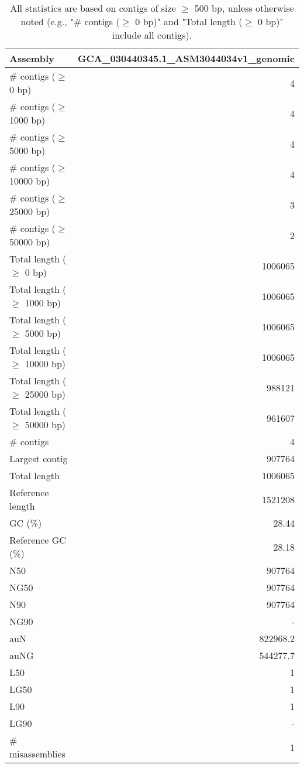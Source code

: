 \documentclass[12pt,a4paper]{article}
\begin{document}
\begin{table}[ht]
\begin{center}
\caption{All statistics are based on contigs of size $\geq$ 500 bp, unless otherwise noted (e.g., "\# contigs ($\geq$ 0 bp)" and "Total length ($\geq$ 0 bp)" include all contigs).}
\begin{tabular}{|l*{1}{|r}|}
\hline
Assembly & GCA\_030440345.1\_ASM3044034v1\_genomic \\ \hline
\# contigs ($\geq$ 0 bp) & 4 \\ \hline
\# contigs ($\geq$ 1000 bp) & 4 \\ \hline
\# contigs ($\geq$ 5000 bp) & 4 \\ \hline
\# contigs ($\geq$ 10000 bp) & 4 \\ \hline
\# contigs ($\geq$ 25000 bp) & 3 \\ \hline
\# contigs ($\geq$ 50000 bp) & 2 \\ \hline
Total length ($\geq$ 0 bp) & 1006065 \\ \hline
Total length ($\geq$ 1000 bp) & 1006065 \\ \hline
Total length ($\geq$ 5000 bp) & 1006065 \\ \hline
Total length ($\geq$ 10000 bp) & 1006065 \\ \hline
Total length ($\geq$ 25000 bp) & 988121 \\ \hline
Total length ($\geq$ 50000 bp) & 961607 \\ \hline
\# contigs & 4 \\ \hline
Largest contig & 907764 \\ \hline
Total length & 1006065 \\ \hline
Reference length & 1521208 \\ \hline
GC (\%) & 28.44 \\ \hline
Reference GC (\%) & 28.18 \\ \hline
N50 & 907764 \\ \hline
NG50 & 907764 \\ \hline
N90 & 907764 \\ \hline
NG90 & - \\ \hline
auN & 822968.2 \\ \hline
auNG & 544277.7 \\ \hline
L50 & 1 \\ \hline
LG50 & 1 \\ \hline
L90 & 1 \\ \hline
LG90 & - \\ \hline
\# misassemblies & 1 \\ \hline

\end{tabular}
\end{center}
\end{table}
\end{document}
